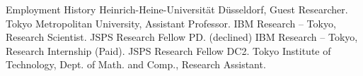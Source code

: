 \begin{rubric}{Employment History}
  \entry*[2025.06 -- 2025.09] Heinrich-Heine-Universität Düsseldorf, Guest Researcher.
  \entry*[2023.04 -- now] Tokyo Metropolitan University, Assistant Professor.
  \entry*[2023.04 -- 2024.03] IBM Research -- Tokyo, Research Scientist.
  \entry*[2023.04 -- 2023.04] JSPS Research Fellow PD. (declined)
  \entry*[2021.08 -- 2021.10] IBM Research -- Tokyo, Research Internship (Paid).
  \entry*[2021.04 -- 2023.03] JSPS Research Fellow DC2.
  \entry*[2020.11 -- 2023.03] Tokyo Institute of Technology, Dept. of Math. and Comp.,
  Research Assistant.
\end{rubric}
